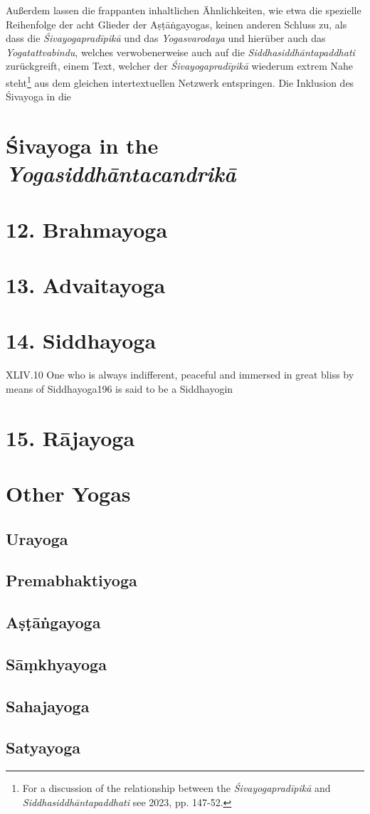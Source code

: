   Außerdem lassen die frappanten inhaltlichen Ähnlichkeiten, wie etwa die spezielle Reihenfolge der acht Glieder der Aṣṭāṅgayogas, keinen anderen Schluss zu, als dass die \textit{Śivayogapradīpikā} und das \textit{Yogasvarodaya} und hierüber auch das \textit{Yogatattvabindu}, welches verwobenerweise auch auf die \textit{Siddhasiddhāntapaddhati} zurückgreift, einem Text, welcher der \textit{Śivayogapradīpikā} wiederum extrem Nahe steht\footnote{For a discussion of the relationship between the \textit{Śivayogapradīpikā} and \textit{Siddhasiddhāntapaddhati} see \citeauthor{powell2023} 2023, pp. 147-52.} aus dem gleichen intertextuellen Netzwerk entspringen. Die Inklusion des Śivayoga in die 

\section{Śivayoga in the \textit{Yogasiddhāntacandrikā}}



\section{12. Brahmayoga}
\label{sivayogaintro}

\section{13. Advaitayoga}
\label{advaitayogaintro}
\section{14. Siddhayoga}
\label{siddhayogaintro}

XLIV.10 One who is always indifferent, peaceful and immersed in great bliss by
means of Siddhayoga196 is said to be a Siddhayogin

\section{15. Rājayoga}
\label{rajayogaintro}

\section{Other Yogas}

\subsection{Urayoga}
\subsection{Premabhaktiyoga}
\subsection{Aṣṭāṅgayoga}
\subsection{Sāṃkhyayoga}
\subsection{Sahajayoga}
\subsection{Satyayoga}





